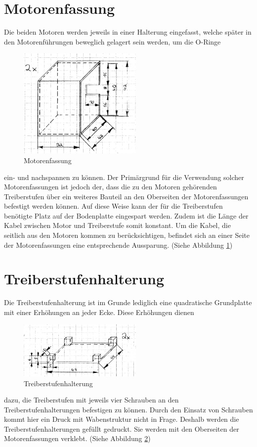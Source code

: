 \section{Motorenfassung}
Die beiden Motoren werden jeweils in einer Halterung eingefasst, welche später in den Motorenführungen beweglich gelagert sein werden, um die O-Ringe 
\begin{figure}
	\includegraphics[width=6cm,angle=0]{content/pictures/motorenfassung.png}
	\caption{Motorenfassung}
	\label{fig:motorenfassung}
\end{figure}
ein- und nachspannen zu können. Der Primärgrund für die Verwendung solcher Motorenfassungen ist jedoch der, dass die zu den Motoren gehörenden Treiberstufen über ein weiteres Bauteil an den Oberseiten der Motorenfassungen befestigt werden können. Auf diese Weise kann der für die Treiberstufen benötigte Platz auf der Bodenplatte eingespart werden. Zudem ist die Länge der Kabel zwischen Motor und Treiberstufe somit konstant. Um die Kabel, die seitlich aus den Motoren kommen zu berücksichtigen, befindet sich an einer Seite der Motorenfassungen eine entsprechende Aussparung. (Siehe Abbildung \ref{fig:motorenfassung})

\section{Treiberstufenhalterung}
Die Treiberstufenhalterung ist im Grunde lediglich eine quadratische Grundplatte mit einer Erhöhungen an jeder Ecke. Diese Erhöhungen dienen
\begin{figure}
	\includegraphics[width=6cm,angle=0]{content/pictures/treiberstufenhalterung.png}
	\caption{Treiberstufenhalterung}
	\label{fig:treiberstufenhalterung}
\end{figure}
dazu, die Treiberstufen mit jeweils vier Schrauben an den Treiberstufenhalterungen befestigen zu können. Durch den Einsatz von Schrauben kommt hier ein Druck mit Wabenstruktur nicht in Frage. Deshalb werden die Treiberstufenhalterungen gefüllt gedruckt. Sie werden mit den Oberseiten der Motorenfassungen verklebt. (Siehe Abbildung \ref{fig:treiberstufenhalterung})

